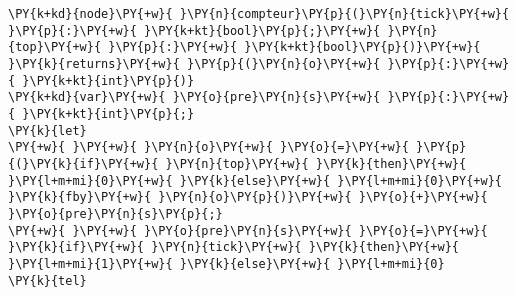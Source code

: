 \begin{Verbatim}[commandchars=\\\{\}]
\PY{k+kd}{node}\PY{+w}{ }\PY{n}{compteur}\PY{p}{(}\PY{n}{tick}\PY{+w}{ }\PY{p}{:}\PY{+w}{ }\PY{k+kt}{bool}\PY{p}{;}\PY{+w}{ }\PY{n}{top}\PY{+w}{ }\PY{p}{:}\PY{+w}{ }\PY{k+kt}{bool}\PY{p}{)}\PY{+w}{ }\PY{k}{returns}\PY{+w}{ }\PY{p}{(}\PY{n}{o}\PY{+w}{ }\PY{p}{:}\PY{+w}{ }\PY{k+kt}{int}\PY{p}{)}
\PY{k+kd}{var}\PY{+w}{ }\PY{o}{pre}\PY{n}{s}\PY{+w}{ }\PY{p}{:}\PY{+w}{ }\PY{k+kt}{int}\PY{p}{;}
\PY{k}{let}
\PY{+w}{ }\PY{+w}{ }\PY{n}{o}\PY{+w}{ }\PY{o}{=}\PY{+w}{ }\PY{p}{(}\PY{k}{if}\PY{+w}{ }\PY{n}{top}\PY{+w}{ }\PY{k}{then}\PY{+w}{ }\PY{l+m+mi}{0}\PY{+w}{ }\PY{k}{else}\PY{+w}{ }\PY{l+m+mi}{0}\PY{+w}{ }\PY{k}{fby}\PY{+w}{ }\PY{n}{o}\PY{p}{)}\PY{+w}{ }\PY{o}{+}\PY{+w}{ }\PY{o}{pre}\PY{n}{s}\PY{p}{;}
\PY{+w}{ }\PY{+w}{ }\PY{o}{pre}\PY{n}{s}\PY{+w}{ }\PY{o}{=}\PY{+w}{ }\PY{k}{if}\PY{+w}{ }\PY{n}{tick}\PY{+w}{ }\PY{k}{then}\PY{+w}{ }\PY{l+m+mi}{1}\PY{+w}{ }\PY{k}{else}\PY{+w}{ }\PY{l+m+mi}{0}
\PY{k}{tel}
\end{Verbatim}
